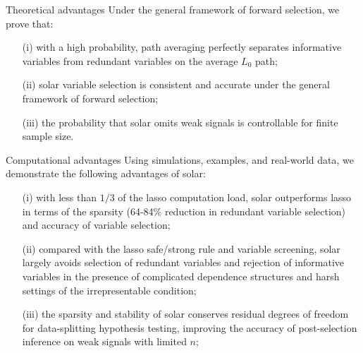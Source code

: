 \documentclass{beamer}
\begin{document}
\begin{frame}{Theoretical advantages}
  Under the \citet{zhang09} general framework of forward selection, we prove that:

  \begin{itemize}  
    \item  [(i)] with a high probability, path averaging perfectly separates informative variables from redundant variables on the average $L_0$ path; 
    
    \item  [(ii)] solar variable selection is consistent and accurate under the general framework of forward selection; 
    
    \item  [(iii)] the probability that solar omits weak signals is controllable for finite sample size.
  \end{itemize}
\end{frame}


\begin{frame}{Computational advantages}
  Using simulations, examples, and real-world data, we demonstrate the following advantages of solar:
  \begin{itemize}  
    \item  [(i)] with less than $1/3$ of the lasso computation load, solar outperforms lasso in terms of the sparsity (64-84\% reduction in redundant variable selection) and accuracy of variable selection;
    
    \item  [(ii)] compared with the lasso safe/strong rule and variable screening, solar largely avoids selection of redundant variables and rejection of informative variables in the presence of complicated dependence structures and harsh settings of the irrepresentable condition;
    
    \item  [(iii)] the sparsity and stability of solar conserves residual degrees of freedom for data-splitting hypothesis testing, improving the accuracy of post-selection inference on weak signals with limited $n$;  
  \end{itemize}
\end{frame}
\end{document}

